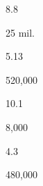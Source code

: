 \begin{description}[font=\normalfont,style=nextline]
\begin{multicols}{2}
\begin{description}[font=\normalfont\itshape,noitemsep]
 \item[] 
 \item[\pbnumberabbr] 8.8 
 \item[\family] \famAustronesian 
 \item[]
\item[\nativespeakers] 25 mil. 
 \item[\region] \regionMadagascar 
 \end{description}\end{multicols}
\item[\langnameMaltese] 
 \begin{multicols}{2}\begin{description}[font=\normalfont\itshape,noitemsep] 
 \item[] 
 \item[\pbnumberabbr] 5.13 
 \item[\family] \famAfroasiatic 
 \item[]
\item[\nativespeakers] 520,000 
 \item[\region] \regionMalta 
 \end{description}\end{multicols}
\item[\langnameManam] 
 \begin{multicols}{2}\begin{description}[font=\normalfont\itshape,noitemsep] 
 \item[] 
 \item[\pbnumberabbr] 10.1 
 \item[\family] \famAustronesian 
 \item[]
\item[\nativespeakers] 8,000 
 \item[\region] \regionNNewGuinea 
 \end{description}\end{multicols}
\item[\langnameMandar] 
 \begin{multicols}{2}\begin{description}[font=\normalfont\itshape,noitemsep] 
 \item[] 
 \item[\pbnumberabbr] 4.3 
 \item[\family] \famAustronesian 
 \item[]
\item[\nativespeakers] 480,000 
 \item[\region] \regionSulawesi\ \Brackets{\regionIndonesia} 
 \end{description}\end{multicols}



\end{description}
